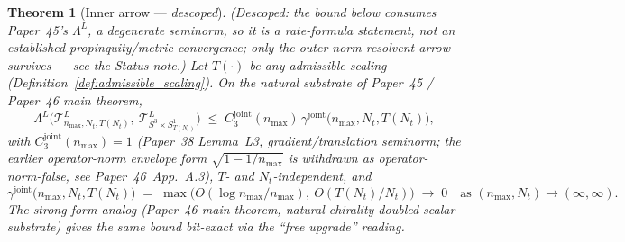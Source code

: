 \documentclass[11pt,a4paper]{article}
\theoremstyle{plain}
\newtheorem{theorem}{Theorem}[section]
\theoremstyle{definition}
\newcommand{\nmax}{n_{\max}}
\newcommand{\Nt}{N_{t}}
\newcommand{\sthree}{S^{3}}
\newcommand{\Sone}{S^{1}}
\newcommand{\Tcal}{\mathcal{T}}
\newcommand{\Lprop}{\Lambda^{L}}
\newcommand{\gammajoint}{\gamma^{\mathrm{joint}}}
\newcommand{\Cthreejoint}{C_{3}^{\mathrm{joint}}}
\begin{document}
\begin{theorem}[Inner arrow --- \emph{descoped}]\label{thm:inner}
\emph{(Descoped:} the bound below consumes Paper~45's $\Lprop$, a
degenerate seminorm, so it is a rate-formula statement, not an
established propinquity/metric convergence; only the outer
norm-resolvent arrow survives --- see the Status note.\emph{)}
Let $T(\cdot)$ be any admissible scaling
(Definition~\ref{def:admissible_scaling}). On the natural substrate of
Paper~45 / Paper~46 main theorem,
\begin{equation}\label{eq:inner_bound}
\Lprop\bigl(\Tcal^{L}_{\nmax, \Nt, T(\Nt)},\
\Tcal^{L}_{\sthree\times \Sone_{T(\Nt)}}\bigr)
\;\le\; \Cthreejoint(\nmax)\,\gammajoint\bigl(\nmax, \Nt, T(\Nt)\bigr),
\end{equation}
with $\Cthreejoint(\nmax) = 1$ (Paper~38 Lemma~L3, gradient/translation
seminorm; the earlier operator-norm envelope form $\sqrt{1 - 1/\nmax}$ is
\emph{withdrawn} as operator-norm-false, see Paper~46~App.~A.3), $T$- and
$\Nt$-independent, and
\begin{equation}\label{eq:inner_rate}
\gammajoint\bigl(\nmax, \Nt, T(\Nt)\bigr)
\;=\; \max\bigl(O(\log\nmax/\nmax),\ O(T(\Nt)/\Nt)\bigr)
\;\to\; 0 \quad \text{as } (\nmax, \Nt)\to (\infty, \infty).
\end{equation}
The strong-form analog (Paper~46 main theorem, natural
chirality-doubled scalar substrate) gives the same bound bit-exact via
the ``free upgrade'' reading.
\end{theorem}
\end{document}
